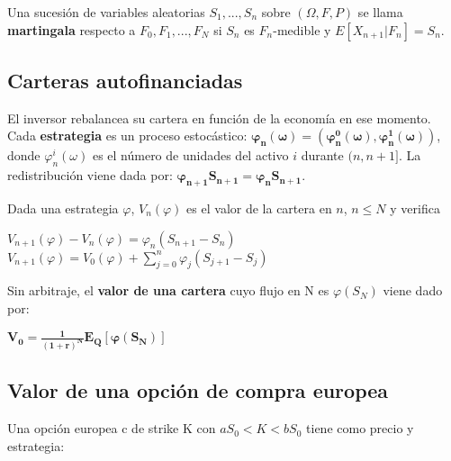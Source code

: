 \documentclass[
10pt, %
a4paper, %
oneside, %
headinclude,footinclude, %
BCOR5mm, %
]{scrartcl}
\newcommand{\n}[1]{\textbf{#1}}
\newcommand{\sub}[1]{_{#1}}
\newcommand{\pot}[1]{^{#1}}
\newcommand{\f}[1]{{\large{${#1}$}}}
\newcommand{\boldf}[1]{\f{\boldsymbol{#1}}}
\newcommand{\sumatorio}[2]{\sum_{#1}^{#2}}
\newcounter{ex}
\begin{document}
			Una sucesión de variables aleatorias \f{S\sub{1},...,S\sub{n}} sobre \f{(\Omega, F, P)} se llama \n{martingala} respecto a \f{F\sub{0},F\sub{1},...,F\sub{N}} si \f{S\sub{n}} es \f{F\sub{n}}-medible y \f{E[X\sub{n+1}| F\sub{n}] = S\sub{n}}.

		\subsection{Carteras autofinanciadas}

			El inversor rebalancea su cartera en función de la economía en ese momento. Cada \n{estrategia} es un proceso estocástico: \boldf{\varphi\sub{n}(\omega) = (\varphi\pot{0}\sub{n}(\omega), \varphi\pot{1}\sub{n}(\omega))}, donde \f{\varphi\pot{i}\sub{n}(\omega)} es el número de unidades del activo \f{i} durante \f{(n,n+1]}. La redistribución viene dada por: \boldf{\varphi\sub{n+1} S\sub{n+1} = \varphi\sub{n}S\sub{n+1}}.

			Dada una estrategia \f{\varphi}, \f{V\sub{n}(\varphi)} es el valor de la cartera en \f{n}, \f{n \leq N} y verifica

			\begin{center} \f{V\sub{n+1}(\varphi) - V\sub{n}(\varphi) = \varphi\sub{n} (S\sub{n+1} - S\sub{n})} \hspace{0.3cm} \f{V\sub{n+1}(\varphi) = V\sub{0}(\varphi) + \sumatorio{j = 0}{n} \varphi\sub{j} (S\sub{j+1} - S\sub{j})} \end{center}

			Sin arbitraje, el \n{valor de una cartera} cuyo flujo en N es \f{\varphi(S\sub{N})} viene dado por: \begin{center} \boldf{V\sub{0} = \frac{1}{(1+r)\pot{N}} E\sub{Q}[\varphi(S\sub{N})]} \end{center}
 		

		\subsection{Valor de una opción de compra europea}

			Una opción europea c de strike K con \f{aS\sub{0} < K < bS\sub{0}} tiene como precio y estrategia:
\end{document}
